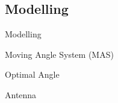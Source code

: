 \subsection{Modelling}

\begin{frame}{Modelling}{}

  \begin{block}{Moving Angle System (MAS)}

  \end{block}
  
  \begin{block}{Optimal Angle}

  \end{block}

  \begin{block}{Antenna}

  \end{block}

\end{frame}

